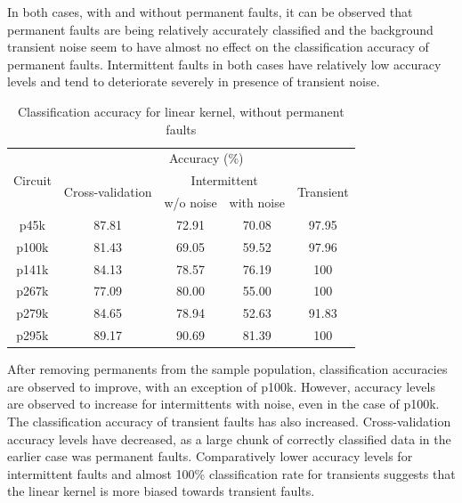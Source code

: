 In both cases, with and without permanent faults, it can be observed that permanent faults are being relatively accurately classified and the background transient noise seem to have almost no effect on the classification accuracy of permanent faults. Intermittent faults in both cases have relatively low accuracy levels and tend to deteriorate severely in presence of transient noise. 


\begin{table}[h]
\captionsetup{justification=centering}
\begin{tabular}{ccccc}
\hline
\multirow{3}{*}{Circuit} & \multicolumn{4}{c}{Accuracy (\%)}\\ \cline{2-5} 
                         & \multirow{2}{*}{Cross-validation} & \multicolumn{2}{c}{Intermittent} & \multirow{2}{*}{Transient} \\ \cline{3-4}
                         &                                   & w/o noise      & with noise      &                            \\ \hline
p45k                     & 87.81                             & 72.91          & 70.08           & 97.95                      \\
p100k                    & 81.43                             & 69.05          & 59.52           & 97.96                      \\
p141k                    & 84.13                             & 78.57          & 76.19           & 100                        \\
p267k                    & 77.09                             & 80.00          & 55.00           & 100                        \\
p279k                    & 84.65                             & 78.94          & 52.63           & 91.83                      \\
p295k                    & 89.17                             & 90.69          & 81.39           & 100           \\
\hline            
\end{tabular}
\caption {Classification accuracy for linear kernel, without permanent faults}
\label{tab:linwop}
\end{table}

After removing permanents from the sample population, classification accuracies are observed to improve, with an exception of p100k. However, accuracy levels are observed to increase for intermittents with noise, even in the case of p100k. The classification accuracy of transient faults has also increased. Cross-validation accuracy levels have decreased, as a large chunk of correctly classified data in the earlier case was permanent faults. Comparatively lower accuracy levels for intermittent faults and almost 100\% classification rate for transients suggests that the linear kernel is more biased towards transient faults.

